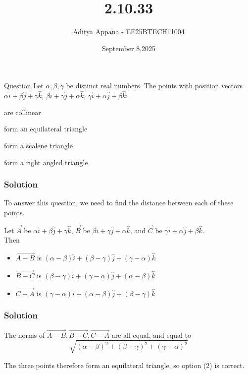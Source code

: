 \documentclass{beamer}
\title %
{2.10.33}
\date{September 8,2025}
\author %
{Aditya Appana - EE25BTECH11004}
\begin{document}
\frame{\titlepage}
\begin{frame}{Question}
Let $\alpha , \beta, \gamma$ be distinct real numbers. The points with position vectors $\alpha\hat{i} + \beta\hat{j} + \gamma\hat{k}$, $\beta\hat{i} +\gamma\hat{j} + \alpha\hat{k}$, $\gamma\hat{i} + \alpha\hat{j} + \beta\hat{k}$:

\begin{enumerate}\begin{multicols}{2}

    \item are collinear
    \item form an equilateral triangle
    \item form a scalene triangle
    \item form a right angled triangle
    \end{multicols}
\end{enumerate}

\end{frame}



\begin{frame}[fragile]
    \frametitle{Solution}

To answer this question, we need to find the distance between each of these points.

Let $\vec{A}$ be $\alpha\hat{i} + \beta\hat{j} + \gamma\hat{k}$, $\vec{B}$ be $\beta\hat{i} +\gamma\hat{j} + \alpha\hat{k}$, and $\vec{C}$ be $\gamma\hat{i} + \alpha\hat{j} + \beta\hat{k}$. \\



Then \begin{itemize}
    \item $\vec{A-B}$ is $(\alpha - \beta)\hat{i} + (\beta - \gamma)\hat{j} + (\gamma - \alpha)\hat{k}$
    \item $\vec{B-C}$ is $(\beta - \gamma)\hat{i} + (\gamma - \alpha)\hat{j} + (\alpha - \beta)\hat{k}$
    \item $\vec{C-A}$ is $(\gamma - \alpha)\hat{i} + (\alpha - \beta)\hat{j} + (\beta - \gamma)\hat{k}$
    \end{itemize}

\end{frame}


\begin{frame}[fragile]
    \frametitle{Solution}

The norms of $\vec{A-B}, \vec{B-C}, \vec{C-A}$ are all equal, and equal to 
$$\sqrt{(\alpha - \beta)^2  + (\beta - \gamma)^2 + (\gamma - \alpha)^2}$$

The three points therefore form an equilateral triangle, so option (2) is correct.

\end{frame}
\end{document}
